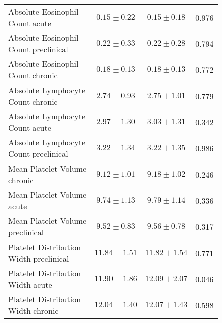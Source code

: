 \begin{table}[htbp]
\begin{tabular}{lccc}
\makecell[l]{Absolute Eosinophil \\ Count acute} & $0.15 \pm 0.22$ & $0.15 \pm 0.18$ & 0.976  \\

\makecell[l]{Absolute Eosinophil \\ Count preclinical} & $0.22 \pm 0.33$ & $0.22 \pm 0.28$ & 0.794  \\

\makecell[l]{Absolute Eosinophil \\ Count chronic} & $0.18 \pm 0.13$ & $0.18 \pm 0.13$ & 0.772  \\

\makecell[l]{Absolute Lymphocyte \\ Count chronic} & $2.74 \pm 0.93$ & $2.75 \pm 1.01$ & 0.779  \\

\makecell[l]{Absolute Lymphocyte \\ Count acute} & $2.97 \pm 1.30$ & $3.03 \pm 1.31$ & 0.342  \\

\makecell[l]{Absolute Lymphocyte \\ Count preclinical} & $3.22 \pm 1.34$ & $3.22 \pm 1.35$ & 0.986  \\

\makecell[l]{Mean Platelet Volume \\ chronic} & $9.12 \pm 1.01$ & $9.18 \pm 1.02$ & 0.246  \\

\makecell[l]{Mean Platelet Volume \\ acute} & $9.74 \pm 1.13$ & $9.79 \pm 1.14$ & 0.336  \\

\makecell[l]{Mean Platelet Volume \\ preclinical} & $9.52 \pm 0.83$ & $9.56 \pm 0.78$ & 0.317  \\

\makecell[l]{Platelet Distribution \\ Width preclinical} & $11.84 \pm 1.51$ & $11.82 \pm 1.54$ & 0.771  \\

\makecell[l]{Platelet Distribution \\ Width acute} & $11.90 \pm 1.86$ & $12.09 \pm 2.07$ & 0.046  \\

\makecell[l]{Platelet Distribution \\ Width chronic} & $12.04 \pm 1.40$ & $12.07 \pm 1.43$ & 0.598  \\


\end{tabular}
\end{table}
